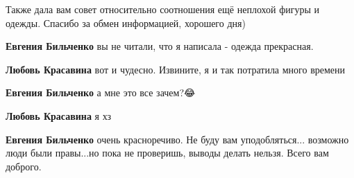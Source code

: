 \begin{itemize}
\begin{itemize}
 
Также дала вам совет относительно соотношения ещё неплохой фигуры и одежды. Спасибо за обмен информацией, хорошего дня)

 
\textbf{Евгения Бильченко} вы не читали, что я написала - одежда прекрасная.

 
\textbf{Любовь Красавина} вот и чудесно. Извините, я и так потратила много времени

 
\textbf{Евгения Бильченко} а мне это все зачем?😂

 
\textbf{Любовь Красавина} я хз

 
\textbf{Евгения Бильченко} очень красноречиво. Не буду вам уподобляться... возможно люди были правы...но пока не проверишь, выводы делать нельзя. Всего вам доброго.

 

\end{itemize}
\end{itemize}
